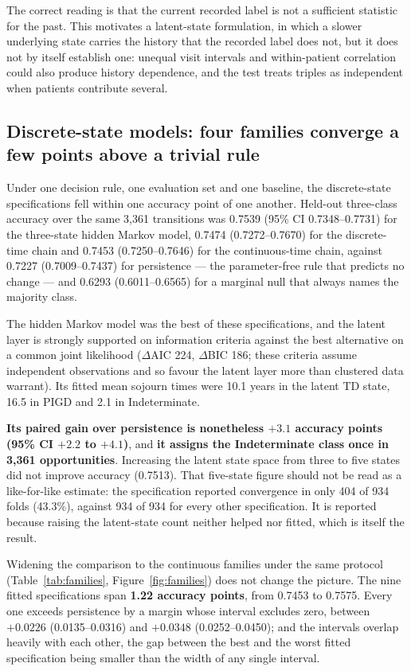 \documentclass[11pt]{article}
\begin{document}
The correct reading is that the current recorded label is not a sufficient
statistic for the past. This motivates a latent-state formulation, in which a
slower underlying state carries the history that the recorded label does not,
but it does not by itself establish one: unequal visit intervals and
within-patient correlation could also produce history dependence, and the test
treats triples as independent when patients contribute several.

\subsection{Discrete-state models: four families converge a few points above a trivial rule}
\label{sec:discrete}

Under one decision rule, one evaluation set and one baseline, the discrete-state
specifications fell within one accuracy point of one another. Held-out
three-class accuracy over the same 3,361 transitions was 0.7539 (95\% CI
0.7348--0.7731) for the three-state hidden Markov model, 0.7474 (0.7272--0.7670)
for the discrete-time chain and 0.7453 (0.7250--0.7646) for the
continuous-time chain, against 0.7227 (0.7009--0.7437) for persistence --- the
parameter-free rule that predicts no change --- and 0.6293 (0.6011--0.6565) for
a marginal null that always names the majority class.

The hidden Markov model was the best of these specifications, and the latent
layer is strongly supported on information criteria against the best alternative
on a common joint likelihood ($\Delta$AIC 224, $\Delta$BIC 186; these criteria
assume independent observations and so favour the latent layer more than
clustered data warrant). Its fitted mean sojourn times were 10.1 years in the
latent TD state, 16.5 in PIGD and 2.1 in Indeterminate.

\textbf{Its paired gain over persistence is nonetheless $+3.1$ accuracy points
(95\% CI $+2.2$ to $+4.1$)}, and \textbf{it assigns the Indeterminate class once
in 3,361 opportunities}. Increasing the latent state space from three to five
states did not improve accuracy (0.7513). That five-state figure should not be
read as a like-for-like estimate: the specification reported convergence in only
404 of 934 folds (43.3\%), against 934 of 934 for every other specification. It
is reported because raising the latent-state count neither helped nor fitted,
which is itself the result.

Widening the comparison to the continuous families under the same protocol
(Table~\ref{tab:families}, Figure~\ref{fig:families}) does not change the
picture. The nine fitted specifications span \textbf{1.22 accuracy points}, from
0.7453 to 0.7575. Every one exceeds persistence by a margin whose interval
excludes zero, between $+0.0226$ (0.0135--0.0316) and $+0.0348$ (0.0252--0.0450);
and the intervals overlap heavily with each other, the gap between the best and
the worst fitted specification being smaller than the width of any single
interval.
\end{document}
